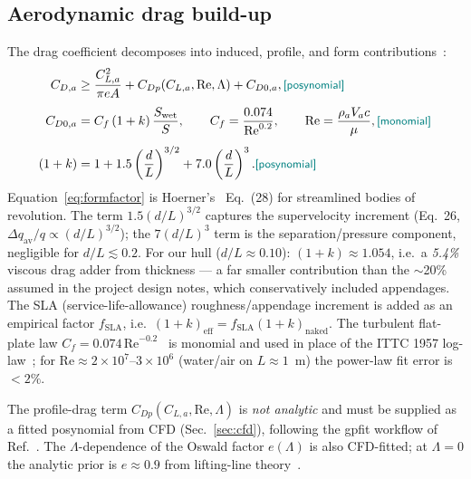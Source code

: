 \documentclass{new-aiaa}
\newcommand{\gpc}[1]{\textcolor{teal}{\small\textsf{[#1]}}} %
\begin{document}
\subsection{Aerodynamic drag build-up}
The drag coefficient decomposes into induced, profile, and form
contributions~\cite{hoburg2014geometric,hoerner1965fluid}:
\begin{align}
C_{D,a} &\ge \frac{C_{L,a}^2}{\pi e A}
           + C_{Dp}(C_{L,a},\mathrm{Re},\Lambda)
           + C_{D0,a}, \gpc{posynomial}\\[4pt]
C_{D0,a} &= C_f\,(1+k)\,\frac{S_{\text{wet}}}{S},
           \qquad C_f = \frac{0.074}{\mathrm{Re}^{0.2}},
           \qquad \mathrm{Re} = \frac{\rho_a V_a c}{\mu}, \gpc{monomial}\\[4pt]
(1+k) &= 1 + 1.5\left(\frac{d}{L}\right)^{3/2}
        +     7.0\left(\frac{d}{L}\right)^{3}. \gpc{posynomial}\label{eq:formfactor}
\end{align}
Equation~\eqref{eq:formfactor} is Hoerner's~\cite{hoerner1965fluid} Eq.~(28) for streamlined bodies of
revolution. The term $1.5(d/L)^{3/2}$ captures the supervelocity increment (Eq.~26, $\Delta q_{\text{av}}/q
\propto(d/L)^{3/2}$); the $7(d/L)^3$ term is the separation/pressure component, negligible for
$d/L\lesssim0.2$. For our hull ($d/L\approx0.10$): $(1+k)\approx1.054$, i.e.\ a
\emph{5.4\%} viscous drag adder from thickness — a far smaller contribution than the $\sim$20\%
assumed in the project design notes, which conservatively included appendages. The SLA (service-life-allowance)
roughness/appendage increment is added as an empirical factor $f_{\text{SLA}}$, i.e.\
$(1+k)_{\text{eff}}=f_{\text{SLA}}(1+k)_{\text{naked}}$. The turbulent flat-plate law
$C_f=0.074\,\mathrm{Re}^{-0.2}$~\cite{hoburg2014geometric} is monomial and used in place of the ITTC
1957 log-law~\cite{myring1976theoretical,allen2000propulsion}; for $\mathrm{Re}\approx
2\times10^{7}$--$3\times10^{6}$ (water/air on $L\approx 1$~m) the power-law fit error is $<2\%$.\par
The profile-drag term $C_{Dp}(C_{L,a},\mathrm{Re},\Lambda)$ is \emph{not analytic} and must be supplied
as a fitted posynomial from CFD (Sec.~\ref{sec:cfd}), following the gpfit workflow of
Ref.~\cite{hoburg2016data}. The $\Lambda$-dependence of the Oswald factor $e(\Lambda)$ is also CFD-fitted;
at $\Lambda=0$ the analytic prior is $e\approx0.9$ from lifting-line theory~\cite{hoerner1985fluid}.
\end{document}
